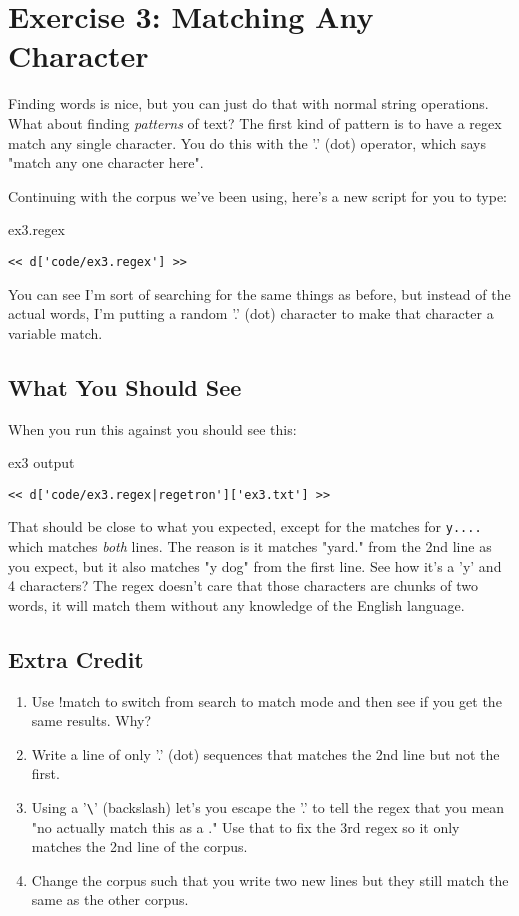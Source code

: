 \chapter{Exercise 3: Matching Any Character}

Finding words is nice, but you can just do that with normal
string operations.  What about finding \emph{patterns} of text?
The first kind of pattern is to have a regex match any single 
character.  You do this with the '.' (dot) operator, which
says "match any one character here".

Continuing with the corpus we've been using, here's
a new script for you to type:

\begin{code}{ex3.regex}
\begin{Verbatim}
<< d['code/ex3.regex'] >>
\end{Verbatim}
\end{code}

You can see I'm sort of searching for the same things as before, but instead
of the actual words, I'm putting a random '.' (dot) character to make that
character a variable match.

\section{What You Should See}

When you run this against  you should see this:

\begin{code}{ex3 output}
\begin{Verbatim}
<< d['code/ex3.regex|regetron']['ex3.txt'] >>
\end{Verbatim}
\end{code}

That should be close to what you expected, except for the matches for
\verb|y....| which matches \emph{both} lines.  The reason is it matches
"yard." from the 2nd line as you expect, but it also matches "y dog"
from the first line.  See how it's a 'y' and 4 characters?  The regex
doesn't care that those characters are chunks of two words, it will match
them without any knowledge of the English language.


\section{Extra Credit}

\begin{enumerate}
\item Use !match to switch from search to match mode and then see if you
    get the same results.  Why?
\item Write a line of only '.' (dot) sequences that matches the 2nd line
    but not the first.
\item Using a '\verb|\|' (backslash) let's you escape the '.' to tell the regex
    that you mean "no actually match this as a ."  Use that to fix the
    3rd regex so it only matches the 2nd line of the corpus.
\item Change the corpus such that you write two new lines but they still
    match the same as the other corpus.
\end{enumerate}

